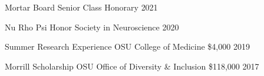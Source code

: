 

\begin{cvhonors}

 \cvhonor
    {Mortar Board} %
    {Senior Class Honorary} %
    {} %
    {2021} %

  \cvhonor
    {Nu Rho Psi} %
    {Honor Society in Neuroscience} %
    {} %
    {2020} %

  \cvhonor
    {Summer Research Experience} %
    {OSU College of Medicine} %
    {\$4,000} %
    {2019} %

  \cvhonor
    {Morrill Scholarship} %
    {OSU Office of Diversity \& Inclusion} %
    {\$118,000} %
    {2017} %


\end{cvhonors}
